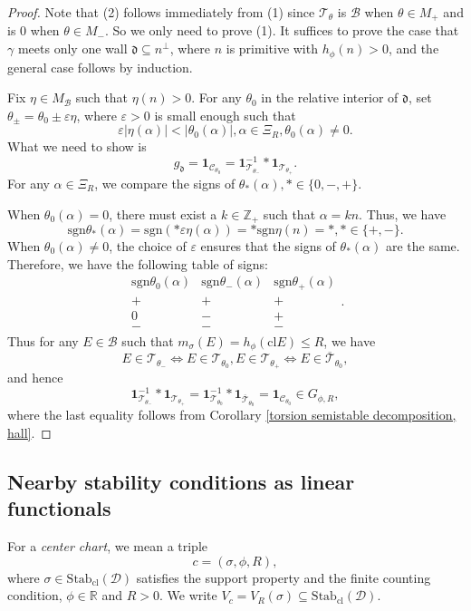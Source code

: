 \documentclass[a4paper,12pt]{amsart}
\numberwithin{equation}{section}
\newcommand{\Stab}{\mathrm{Stab}}
\newcommand{\sgn}{\mathrm{sgn}}
\newcommand{\cl}{\mathrm{cl}}
\newcommand{\1}{\mathbf{1}}
\begin{document}
\begin{proof}
    Note that (2) follows immediately from (1) since $\mathcal{T}_\theta$ is $\mathcal{B}$ when $\theta\in M_+$ and is $0$ when $\theta\in M_-$. So we only need to prove (1). It suffices to prove the case that $\gamma$ meets only one wall $\mathfrak{d}\subseteq n^\perp$, where $n$ is primitive with $h_\phi(n)>0$, and the general case follows by induction.

    Fix $\eta\in M_\mathcal{B}$ such that $\eta(n)>0$. For any $\theta_0$ in the relative interior of $\mathfrak{d}$, set $\theta_\pm=\theta_0\pm\varepsilon\eta$, where $\varepsilon>0$ is small enough such that
    \[\varepsilon|\eta(\alpha)|<|\theta_0(\alpha)|,\alpha\in\Xi_R,\theta_0(\alpha)\neq0.\]
    What we need to show is
    \[g_{\mathfrak{d}}=\1_{\mathcal{C}_{\theta_0}}=\1_{\mathcal{T}_{\theta_-}}^{-1}*\1_{\mathcal{T}_{\theta_+}}.\]
    For any $\alpha\in\Xi_R$, we compare the signs of $\theta_*(\alpha),*\in\{0,-,+\}$.

    When $\theta_0(\alpha)=0$, there must exist a $k\in\mathbb{Z}_+$ such that $\alpha=kn$. Thus, we have
    \[\sgn\theta_*(\alpha)=\sgn(*\varepsilon\eta(\alpha))=*\sgn\eta(n)=*,*\in\{+,-\}.\]
    When $\theta_0(\alpha)\neq0$, the choice of $\varepsilon$ ensures that the signs of $\theta_*(\alpha)$ are the same. Therefore, we have the following table of signs:
    \[\begin{array}{c|c|c}
  \sgn\theta_0(\alpha)&\sgn\theta_-(\alpha)&\sgn\theta_+(\alpha)\\ \hline
  +&+&+\\
  0&-&+\\
  -&-&-
 \end{array}.\]
 Thus for any $E\in\mathcal{B}$ such that $m_\sigma(E)=h_\phi(\cl E)\leqslant R$, we have
 \[E\in\mathcal{T}_{\theta_-}\iff E\in\mathcal{T}_{\theta_0}, E\in\mathcal{T}_{\theta_+}\iff E\in\overline{\mathcal{T}}_{\theta_0},\]
 and hence
 \[\1_{\mathcal{T}_{\theta_-}}^{-1}*\1_{\mathcal{T}_{\theta_+}}=\1_{\mathcal{T}_{\theta_0}}^{-1}*\1_{\overline{\mathcal{T}}_{\theta_0}}=\1_{\mathcal{C}_{\theta_0}}\in G_{\phi,R},\]
 where the last equality follows from Corollary \ref{torsion semistable decomposition, hall}.
\end{proof}
\subsection{Nearby stability conditions as linear functionals}
For a \emph{center chart}, we mean a triple
\[c=(\sigma,\phi,R),\]
where $\sigma\in\Stab_\cl(\mathcal{D})$ satisfies the support property and the finite counting condition, $\phi\in\mathbb{R}$ and $R>0$. We write $V_c=V_R(\sigma)\subseteq\Stab_\cl(\mathcal{D})$.
\end{document}

